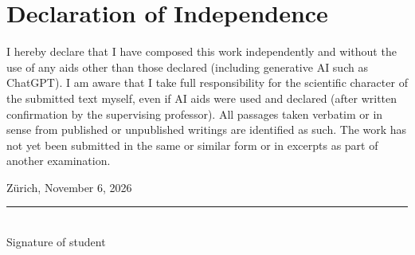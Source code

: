 \chapter*{Declaration of Independence}


I hereby declare that I have composed this work independently and without the use of any aids other than those declared (including generative AI such as ChatGPT). I am aware that I take full responsibility for the scientific character of the submitted text myself, even if AI aids were used and declared (after written confirmation by the supervising professor). All passages taken verbatim or in sense from published or unpublished writings are identified as such. The work has not yet been submitted in the same or similar form or in excerpts as part of another examination.

\vspace{2cm}


\noindent
\begin{minipage}[t]{0.45\textwidth}
    Zürich, November 6, 2026
\end{minipage}
\hfill
\begin{minipage}[t]{0.45\textwidth}
    \raggedleft
    \rule{6cm}{0.4pt}\\[0.3cm]
    Signature of student
\end{minipage}